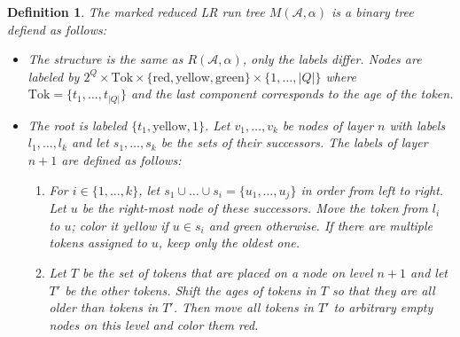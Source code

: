 \documentclass{article}
\newtheorem{definition}{Definition}
\begin{document}
\begin{definition}
	The marked reduced LR run tree $M(\mathcal{A}, \alpha)$ is a binary tree defiend as follows:
	\begin{itemize}
		\item The structure is the same as $R(\mathcal{A}, \alpha)$, only the labels differ. Nodes are labeled by $2^Q \times \text{Tok} \times \{\text{red}, \text{yellow}, \text{green}\} \times \{1, \dots, |Q|\}$ where $\text{Tok} = \{t_1, \dots, t_{|Q|}\}$ and the last component corresponds to the age of the token.
		\item The root is labeled $\{t_1, \text{yellow}, 1\}$. Let $v_1, \dots, v_k$ be nodes of layer $n$ with labels $l_1, \dots, l_k$ and let $s_1, \dots, s_k$ be the sets of their successors. The labels of layer $n+1$ are defined as follows:
		\begin{enumerate}
			\item For $i \in \{1, \dots, k\}$, let $s_1 \cup \dots \cup s_i = \{u_1, \dots, u_j\}$ in order from left to right. Let $u$ be the right-most node of these successors. Move the token from $l_i$ to $u$; color it yellow if $u \in s_i$ and green otherwise. If there are multiple tokens assigned to $u$, keep only the oldest one.
			\item Let $T$ be the set of tokens that are placed on a node on level $n+1$ and let $T'$ be the other tokens. Shift the ages of tokens in $T$ so that they are all older than tokens in $T'$. Then move all tokens in $T'$ to arbitrary empty nodes on this level and color them red.
		\end{enumerate}
	\end{itemize}
\end{definition}
\end{document}
